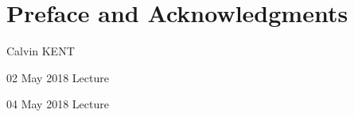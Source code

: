 \documentclass[11pt]{article} %
\begin{document}
	\renewcommand*{\Term}{Term 201x} %
	\renewcommand*{\CourseCode}{MATH 000} %
	\renewcommand*{\CourseName}{Course Name} %
	\renewcommand*{\ProfName}{ProfFName ProfLName} %
	\renewcommand*{\LDate}{00 MONTH 201x} %
	\renewcommand*{\COlink}{http://www.student.math.uwaterloo.ca/~c2kent/} %
	\lecturetitle
	\tableofcontents
	\cleardoublepage
	\newpage
	\section*{Preface and Acknowledgments}
	\CKpreface
	\rrule
	\hfill Calvin KENT
	\cleardoublepage
	\newpage
	\pagestyle{Lecture}
	\fancyhfoffset[E,O]{0pt} %
	\begin{comment}
	\end{comment}
\begin{lec}{02 May 2018}
	Lecture
\end{lec}
\begin{lec}{04 May 2018}
	Lecture
\end{lec}
\end{document}
